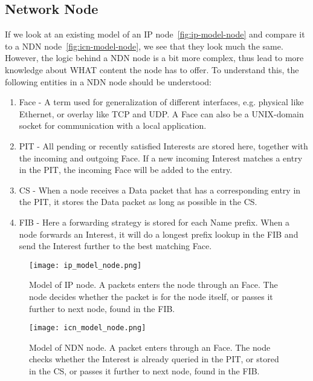 \subsection{Network Node}
If we look at an existing model of an \gls{IP} node~\autoref{fig:ip-model-node} and compare it to a \gls{NDN} node~\autoref{fig:icn-model-node}, we see that they look much the same.
However, the logic behind a \gls{NDN} node is a bit more complex, thus lead to more knowledge about WHAT content the node has to offer.
To understand this, the following entities in a \gls{NDN} node should be understood:
\begin{enumerate}\label{ndn-node-modules}
  \item Face - A term used for generalization of different interfaces, e.g. physical like Ethernet, or overlay like \gls{TCP} and \gls{UDP}. A Face can also be a UNIX-domain socket for communication with a local application.
  \item \gls{PIT} - All pending or recently satisfied Interests are stored here, together with the incoming and outgoing Face.
  If a new incoming Interest matches a entry in the \gls{PIT}, the incoming Face will be added to the entry. 
  \item \gls{CS} - When a node receives a Data packet that has a corresponding entry in the \gls{PIT}, it stores the Data packet as long as possible in the \gls{CS}. 
  \item \gls{FIB} - Here a forwarding strategy is stored for each Name prefix. 
  When a node forwards an Interest, it will do a longest prefix lookup in the \gls{FIB} and send the Interest further to the best matching Face.
\end{enumerate}

\begin{figure}[H]
  \centering
  \texttt{[image: ip\_model\_node.png]}
  \caption{Model of IP node. A packets enters the node through an Face. 
  The node decides whether the packet is for the node itself, or passes it further to next node, found in the FIB.}
  \label{fig:ip-model-node}
\end{figure}

\begin{figure}[H]
  \centering
  \texttt{[image: icn\_model\_node.png]}
  \caption{Model of NDN node. A packet enters through an Face. 
  The node checks whether the Interest is already queried in the PIT, or stored in the CS, or passes it further to next node, found in the FIB.}
  \label{fig:icn-model-node}
\end{figure}

